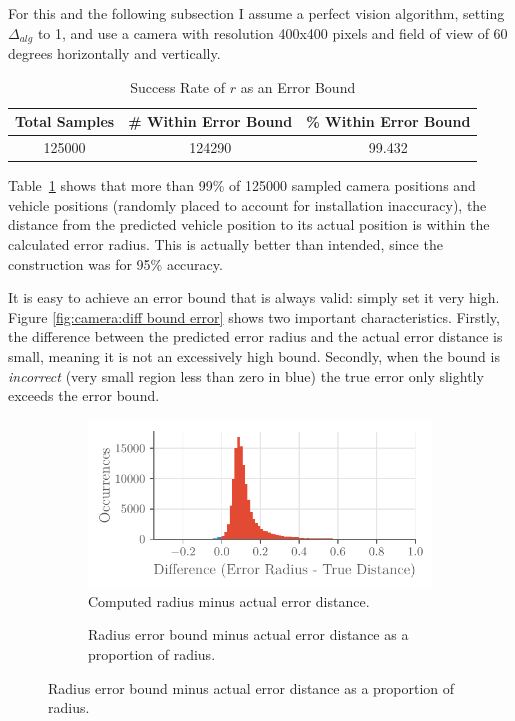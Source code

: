\documentclass[a4paper,12pt,twoside,openright]{report}
\begin{document}
For this and the following subsection I assume a perfect vision algorithm,
setting $\Delta_{alg}$ to 1, and use a camera with resolution 400x400 pixels and
field of view of 60 degrees horizontally and vertically.

\begin{table}[htb]
    \centering
    \caption[$r$ as an Error Bound]{Success Rate of $r$ as an Error Bound}
    \label{tab:camera:bound accuracy}
    \begin{tabular}{@{}ccc@{}}
        \toprule
        Total Samples & \# Within Error Bound & \% Within Error Bound \\ \midrule
        125000              & 124290                  & 99.432 
    \end{tabular}
\end{table}

Table~\ref{tab:camera:bound accuracy} shows that more than 99\% of 125000 sampled camera positions
and vehicle positions (randomly placed to account for installation inaccuracy), the distance from the predicted vehicle position to 
its actual position is within the calculated error radius. This
is actually better than intended, since the construction was for 95\% accuracy.

It is easy to achieve an error bound that is always valid: simply set it very high.
Figure \ref{fig:camera:diff bound error} shows two important characteristics. Firstly, the difference between
the predicted error radius and the actual error distance is small, meaning
it is not an excessively high bound. Secondly, when the bound is \textit{incorrect} (very small region less than zero in blue)
the true error only slightly exceeds the error bound.


\begin{figure}[h!]
\begin{subfigure}[t]{0.45\textwidth}
    \centering
    \includegraphics[width=1\linewidth]{figures/camera/diff_radius_true_error.pdf}
    \caption[Bound Minus True Distance]{Computed radius minus actual error distance.}
    \label{fig:camera:diff}
\end{subfigure}
\begin{subfigure}[t]{0.45\textwidth}
    \centering
    \resizebox{1\linewidth}{!}{}
    \caption[Bound Minus True Distance as a Proportion]{Radius error bound minus actual error distance as a proportion of radius.}
    \label{fig:camera:proportional diff}
\end{subfigure}
\label{fig:camera:diffs}
\end{figure}
\end{document}
